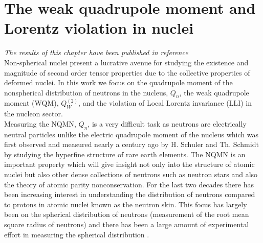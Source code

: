 \documentclass[8pt,a4paper, twoside]{report}
\begin{document}
\chapter{The weak quadrupole moment and Lorentz violation in nuclei}
\textit{The results of this chapter have been published in reference \cite{LFWQM2018} } \\
\linebreak
Non-spherical nuclei present a lucrative avenue for studying the existence and magnitude of second order tensor properties due to the collective properties of deformed nuclei. In this work we focus on the quadrupole moment of the nonspherical  distribution of neutrons in the nucleus, $Q_{n}$,  the weak quadrupole moment (WQM), $Q_{W}^{(2)}$,  and the violation of Local Lorentz invariance (LLI) in the nucleon sector. \\
\linebreak
Measuring the NQMN, $Q_{n}$,  is a very difficult  task as neutrons are electrically neutral particles unlike the electric quadrupole moment of the nucleus which was first observed and measured nearly a century ago by H. Schuler and Th. Schmidt \cite{Schuler1935(1), Schuler1935(2), Casimir1935} by studying the hyperfine structure of rare earth elements. The NQMN is an important property which will give insight not only into the structure of  atomic nuclei but also other dense collections of neutrons such as neutron stars \cite{Brown2000, Furnstahl2002, Typel2001, Reinhard2010} and also the theory of atomic parity nonconservation. For the last two decades there has been increasing interest in understanding the distribution of neutrons compared to protons in atomic nuclei known as the neutron skin. This focus has largely been on the spherical distribution of neutrons (measurement of the root mean square radius of neutrons) and there has been a large amount of experimental effort in measuring the spherical distribution \cite{Clark2003, Trzcinska2001, Lenske2009, Abrahamyan2012}. 
\end{document}
